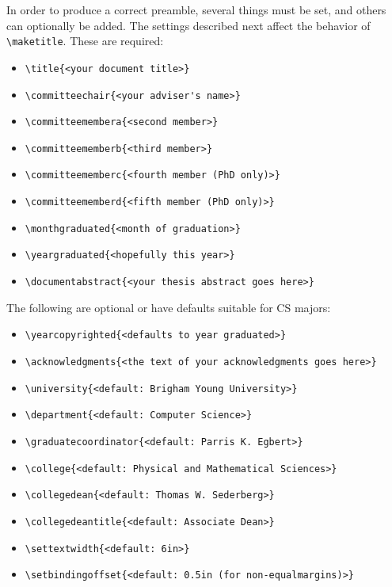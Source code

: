 \documentclass[phd,hardcopy,twosidetoc,letterpaper,chaptercenter,parttop,lol,lof,lot]{byumsphd}
\begin{document}
In order to produce a correct preamble, several things must be set, and others can optionally be added.  The settings described next affect the behavior of \verb|\maketitle|.  These are required:
\begin{itemize}
    \item \verb|\title{<your document title>}|
    \item \verb|\committeechair{<your adviser's name>}|
    \item \verb|\committeemembera{<second member>}|
    \item \verb|\committeememberb{<third member>}|
    \item \verb|\committeememberc{<fourth member (PhD only)>}|
    \item \verb|\committeememberd{<fifth member (PhD only)>}|
    \item \verb|\monthgraduated{<month of graduation>}|
    \item \verb|\yeargraduated{<hopefully this year>}|
    \item \verb|\documentabstract{<your thesis abstract goes here>}|
\end{itemize}
The following are optional or have defaults suitable for CS majors:
\begin{itemize}
    \item \verb|\yearcopyrighted{<defaults to year graduated>}|
    \item \verb|\acknowledgments{<the text of your acknowledgments goes here>}|
    \item \verb|\university{<default: Brigham Young University>}|
    \item \verb|\department{<default: Computer Science>}|
    \item \verb|\graduatecoordinator{<default: Parris K. Egbert>}|
    \item \verb|\college{<default: Physical and Mathematical Sciences>}|
    \item \verb|\collegedean{<default: Thomas W. Sederberg>}|
    \item \verb|\collegedeantitle{<default: Associate Dean>}|
    \item \verb|\settextwidth{<default: 6in>}|
    \item \verb|\setbindingoffset{<default: 0.5in (for non-equalmargins)>}|
\end{itemize}
\end{document}
